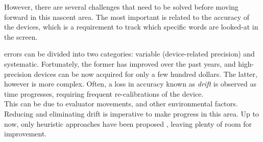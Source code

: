 However, there are several challenges that need to be solved before moving forward in this nascent area. The most important is related to the accuracy of the \eye devices, which is a requirement to track which specific words are looked-at in the screen. 
\pagebreak

\Eye errors can be divided into two categories: variable (device-related precision) and systematic. Fortunately, the former has improved over the past years, and high-precision devices can be now acquired for only a few hundred dollars. The latter, however is more complex. Often, a loss in accuracy known as \emph{drift} is observed as time progresses, requiring frequent re-calibrations of the \eye device. \\
This can be due to evaluator movements, and other environmental factors. Reducing and eliminating drift is imperative to make progress in this area. Up to now, only heuristic approaches have been proposed \cite{mishra-carl-bhattacharyya:2012:ETNLP}, leaving plenty of room for improvement.


